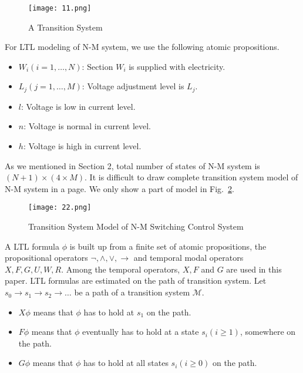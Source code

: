 \documentclass[runningheads,a4paper]{llncs}
\begin{document}
\begin{figure}
\centering
\texttt{[image: 11.png]}
\caption{A Transition System}
\label{fig1}
\end{figure}


For LTL modeling of N-M system, we use the following atomic propositions. 
\begin{itemize}
\item $W_i (i=1, \ldots,  N)$: Section $W_i$ is supplied with electricity. 

\item  $L_j (j=1, \ldots,  M)$: Voltage adjustment level is $L_j$. 

\item  $l$: Voltage is low in current level.

\item $n$: Voltage is normal in current level. 	

\item $h$: Voltage is high in current level.
\end{itemize}

As we mentioned in Section 2, total number of states of N-M system is $(N+1) \times (4 \times M)$. It is difficult to draw complete transition system model of N-M system in a page. We only show a part of model in Fig.~\ref{fig2}. 

\begin{figure}
\centering
\texttt{[image: 22.png]}
\caption{Transition System Model of N-M Switching Control System}
\label{fig2}
\end{figure}

A LTL formula $\phi$ is built up from a finite set of atomic propositions, the propositional operators $\neg, \land, \lor, \rightarrow$  and temporal modal operators $X, F, G, U, W, R$. Among the temporal operators, $X, F$ and $G$ are used in this paper. LTL formulas are estimated on the path of transition system. Let $s_0 \rightarrow s_1 \rightarrow s_2 \rightarrow\ldots$ be a path of a transition system $\mathcal{M}$. 

\begin{itemize}
\item $X\phi$ means that $\phi$ has to hold at $s_1$ on the path.  

\item $F\phi$ means that $\phi$ eventually has to hold at a state $s_i (i \geq 1)$, somewhere on the path. 

\item  $G\phi$ means that $\phi$ has to hold at all states $s_i (i \geq 0)$ on the path. 
\end{itemize}
\end{document}
